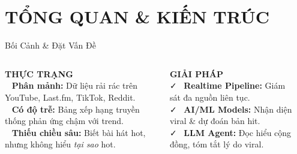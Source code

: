 \documentclass[aspectratio=169,9pt]{beamer}
\begin{document}
\section{TỔNG QUAN \& KIẾN TRÚC}

\begin{frame}{Bối Cảnh \& Đặt Vấn Đề}

\begin{columns}[c]
\begin{badbox}
  \textbf{THỰC TRẠNG}\\[4pt]
  \scriptsize
  \faTimes~ \textbf{Phân mảnh:} Dữ liệu rải rác trên YouTube, Last.fm, TikTok, Reddit.\\[4pt]
  \faTimes~ \textbf{Có độ trễ:} Bảng xếp hạng truyền thống phản ứng chậm với trend.\\[4pt]
  \faTimes~ \textbf{Thiếu chiều sâu:} Biết bài hát hot, nhưng không hiểu \textit{tại sao} hot.
\end{badbox}

\vspace{0.3cm}
\begin{goodbox}
  \textbf{GIẢI PHÁP}\\[4pt]
  \scriptsize
  \faCheck~ \textbf{Realtime Pipeline:} Giám sát đa nguồn liên tục.\\[4pt]
  \faCheck~ \textbf{AI/ML Models:} Nhận diện viral \& dự đoán bản hit.\\[4pt]
  \faCheck~ \textbf{LLM Agent:} Đọc hiểu cộng đồng, tóm tắt lý do viral.
\end{goodbox}

\begin{center}
\end{center}
\end{columns}
\end{frame}
\end{document}
